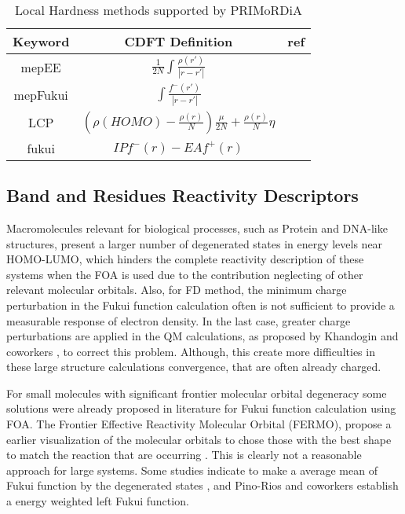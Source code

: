 \documentclass[a4paper,11pt]{refart}
\begin{document}
\hspace*{-\leftmarginwidth}
\begin{minipage}{\fullwidth}
	\begin{table}[H]
		\centering	
		\caption{Local Hardness methods supported by PRIMoRDiA}
		\begin{tabular}{c|c|c}
			\toprule
			Keyword & CDFT Definition & ref \\
			\midrule
			mepEE & $ \frac{1}{2N} \int \frac{\rho(r')}{|r - r'|}$   &    \cite{berkowitz1985concept} \\ \hline	
			mepFukui & $ \int \frac{f^{-}(r')}{|r - r'|}$  & \cite{cardenas2011fukui} \\ \hline	
			LCP & $\left (\rho(HOMO) - \frac{\rho(r)}{N} \right) \frac{\mu}{2N} + \frac{\rho(r)}{N}\eta$ & \cite{gal2011new} \\ \hline			
			fukui &$IP f^-(r) - EA f^+(r)$  & \cite{meneses2004proposal} \\
			\bottomrule
		\end{tabular} 
		\label{tab3}	
	\end{table}	
\end{minipage}

\subsection{Band and Residues Reactivity Descriptors}

Macromolecules relevant for biological processes, such as Protein and DNA-like structures, present a larger number of degenerated states in energy levels near HOMO-LUMO, which hinders the complete reactivity description of these systems when the FOA is used due to the contribution neglecting of other relevant molecular orbitals\cite{Fukushima2008}. Also, for FD method, the minimum charge perturbation in the Fukui function calculation often is not sufficient to provide a measurable response of electron density. In the last case, greater charge perturbations are applied in the QM calculations, as proposed by Khandogin and coworkers \cite{khandogin2003insights}, to correct this problem. Although, this create more difficulties in these large structure calculations convergence, that are often already charged.   
 
For small molecules with significant frontier molecular orbital degeneracy some solutions were already proposed in literature for Fukui function calculation using FOA. The Frontier Effective Reactivity Molecular Orbital (FERMO), propose a earlier visualization of the molecular orbitals to chose those with the best shape to match the reaction that are occurring \cite{la2012computational}. This is clearly not a reasonable approach for large systems. Some studies indicate to make a average mean of Fukui function by the degenerated states \cite{gal2011new,torrent2008hardness}, and Pino-Rios and coworkers \cite{pino2017proposal} establish a energy weighted left Fukui function. 
\end{document}
